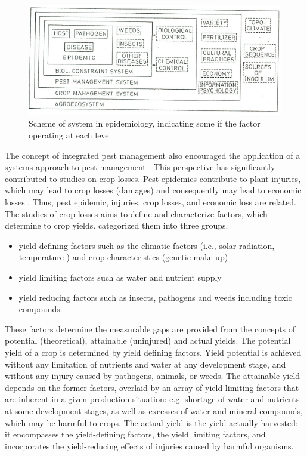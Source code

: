 \begin{figure}
\includegraphics[width=12cm]{system_level}
\centering
\caption{Scheme of system in epidemiology, indicating some if the factor operating at each level \cite{kranz1980systems}}
\label{fig:system_level}
\end{figure}

The concept of integrated pest management also encouraged the application of a systems approach to pest management \citep{teng1992implementing}. This perspective has significantly contributed to studies on crop losses. Pest epidemics contribute to plant injuries, which may lead to crop losses (damages) and consequently may lead to economic losses \citep{Zadok1985}. Thus, pest epidemic, injuries, crop losses, and economic loss are related. 
The studies of crop losses aims to define and characterize factors, which determine to crop yields. \citet{rabbinge1993ecological} categorized them into three groups.

\begin{itemize}
\item yield defining factors such as the climatic factors (i.e., solar radiation, temperature ) and crop characteristics (genetic make-up)
\item yield limiting factors such as water and nutrient supply
\item yield reducing factors such as insects, pathogens and weeds including toxic compounds.
\end{itemize} 
 
These factors determine the measurable gaps are provided from the concepts of potential (theoretical), attainable (uninjured) and actual yields. The potential yield of a crop is determined by yield defining factors. Yield potential is achieved without any limitation of nutrients and water at any development stage, and without any injury caused by pathogens, animals, or weeds. The attainable yield depends on the former factors, overlaid by an array of yield-limiting factors that are inherent in a given production situation: e.g. shortage of water and nutrients at some development stages, as well as excesses of water and mineral compounds, which may be harmful to crops. The actual yield is the yield actually harvested: it encompasses the yield-defining factors, the yield limiting factors, and incorporates the yield-reducing effects of injuries caused by harmful organisms. 

